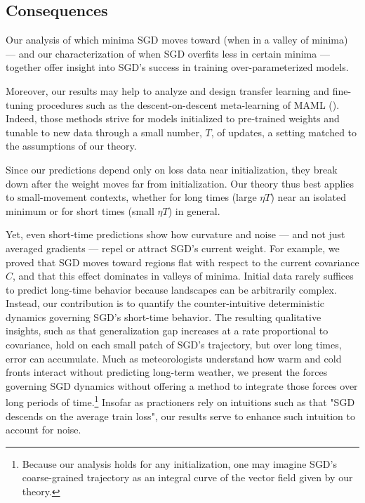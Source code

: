 \documentclass{article}
\theoremstyle{plain}
\theoremstyle{definition}
\begin{document}
    \subsection{Consequences}

        Our analysis of which minima SGD moves toward (when in a valley of
        minima) --- and our characterization of when SGD overfits less in
        certain minima --- together offer insight into SGD's success in
        training over-parameterized models. 

        Moreover, our results may help to analyze and design transfer learning
        and fine-tuning procedures such as the descent-on-descent meta-learning of
        MAML (\cite{fi17}).  Indeed, those methods strive for models
        initialized to pre-trained weights and tunable to new data through a
        small number, $T$, of updates, a setting matched to the assumptions of
        our theory.

        Since our predictions depend only on loss data near initialization,
        they break down after the weight moves far from initialization.  Our
        theory thus best applies to small-movement contexts, whether for long
        times (large $\eta T$) near an isolated minimum or for short times
        (small $\eta T$) in general.
        
        Yet, even short-time predictions show how curvature and noise ---
        and not just averaged gradients --- repel or attract SGD's current
        weight.  For example, we proved that SGD moves toward regions flat with
        respect to the current covariance $C$, and that this effect dominates
        in valleys of minima. Initial data rarely suffices to
        predict long-time behavior because landscapes can be arbitrarily
        complex.  Instead, our contribution is to quantify the
        counter-intuitive deterministic dynamics governing SGD's short-time
        behavior. The resulting qualitative insights, such as that
        generalization gap increases at a rate proportional to covariance, hold
        on each small patch of SGD's trajectory, but over long times, error can
        accumulate.  
        Much as meteorologists understand how warm and cold fronts interact
        without predicting long-term weather, we present the forces governing
        SGD dynamics without offering a method to integrate those forces over
        long periods of time.\footnote{
            Because our analysis holds for any initialization, one may imagine
            SGD's coarse-grained trajectory as an integral curve of the vector
            field given by our theory.
        }
        Insofar as practioners rely on intuitions such as that "SGD descends on
        the average train loss", our results serve to enhance such intuition to
        account for noise.
\end{document}
